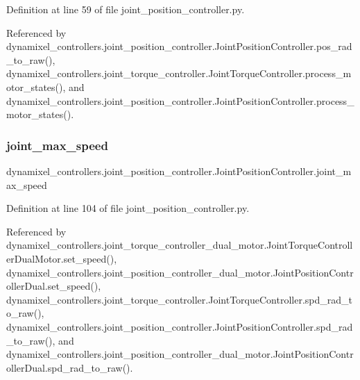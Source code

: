 Definition at line 59 of file joint\+\_\+position\+\_\+controller.\+py.



Referenced by dynamixel\+\_\+controllers.\+joint\+\_\+position\+\_\+controller.\+Joint\+Position\+Controller.\+pos\+\_\+rad\+\_\+to\+\_\+raw(), dynamixel\+\_\+controllers.\+joint\+\_\+torque\+\_\+controller.\+Joint\+Torque\+Controller.\+process\+\_\+motor\+\_\+states(), and dynamixel\+\_\+controllers.\+joint\+\_\+position\+\_\+controller.\+Joint\+Position\+Controller.\+process\+\_\+motor\+\_\+states().

\mbox{\label{classdynamixel__controllers_1_1joint__position__controller_1_1_joint_position_controller_ab97b45243a60c0be6e4d32f37eb17df1}} 
\subsubsection{\texorpdfstring{joint\+\_\+max\+\_\+speed}{joint\_max\_speed}}
{\footnotesize\ttfamily dynamixel\+\_\+controllers.\+joint\+\_\+position\+\_\+controller.\+Joint\+Position\+Controller.\+joint\+\_\+max\+\_\+speed}



Definition at line 104 of file joint\+\_\+position\+\_\+controller.\+py.



Referenced by dynamixel\+\_\+controllers.\+joint\+\_\+torque\+\_\+controller\+\_\+dual\+\_\+motor.\+Joint\+Torque\+Controller\+Dual\+Motor.\+set\+\_\+speed(), dynamixel\+\_\+controllers.\+joint\+\_\+position\+\_\+controller\+\_\+dual\+\_\+motor.\+Joint\+Position\+Controller\+Dual.\+set\+\_\+speed(), dynamixel\+\_\+controllers.\+joint\+\_\+torque\+\_\+controller.\+Joint\+Torque\+Controller.\+spd\+\_\+rad\+\_\+to\+\_\+raw(), dynamixel\+\_\+controllers.\+joint\+\_\+position\+\_\+controller.\+Joint\+Position\+Controller.\+spd\+\_\+rad\+\_\+to\+\_\+raw(), and dynamixel\+\_\+controllers.\+joint\+\_\+position\+\_\+controller\+\_\+dual\+\_\+motor.\+Joint\+Position\+Controller\+Dual.\+spd\+\_\+rad\+\_\+to\+\_\+raw().


